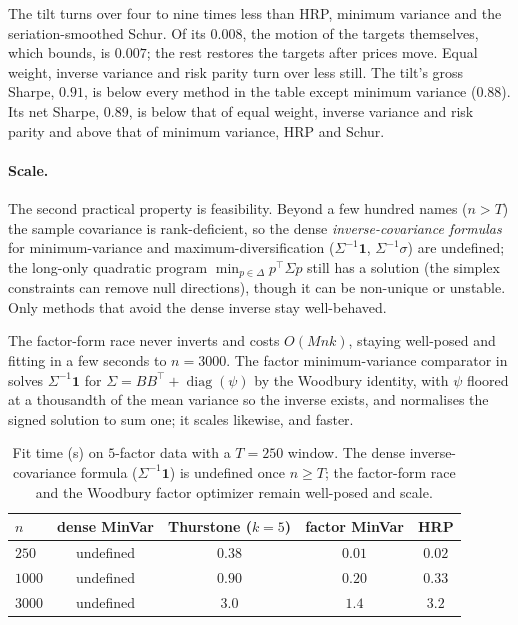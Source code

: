 The tilt turns over four to nine times less than HRP, minimum variance and the
seriation-smoothed Schur. Of its $0.008$, the motion of the targets themselves,
which  bounds, is $0.007$; the rest restores the targets after
prices move. Equal weight, inverse variance and risk parity turn over less still.
The tilt's gross Sharpe, $0.91$, is below every method in the table except
minimum variance ($0.88$). Its net Sharpe, $0.89$, is below that of equal weight,
inverse variance and risk parity and above that of minimum variance, HRP and
Schur.

\paragraph{Scale.}
The second practical property is feasibility.
Beyond a few hundred names ($n > T$)
the sample covariance is rank-deficient, so the dense \emph{inverse-covariance
formulas} for minimum-variance and maximum-diversification
\parencite{choueifaty2008} ($\Sigma^{-1}\mathbf 1$, $\Sigma^{-1}\sigma$) are
undefined; the long-only quadratic program
$\min_{p\in\Delta} p^\top\Sigma p$ still has a solution (the simplex constraints can
remove null directions), though it can be non-unique or unstable.
Only
methods that avoid the dense inverse stay well-behaved.

The factor-form
race never inverts and costs $O(Mnk)$, staying well-posed
and fitting in a few seconds to $n = 3000$.
The factor minimum-variance comparator
in  solves $\Sigma^{-1}\mathbf 1$ for
$\Sigma = BB^\top + \operatorname{diag}(\psi)$ by the Woodbury identity, with
$\psi$ floored at a thousandth of the mean variance so the inverse exists, and
normalises the signed solution to sum one; it scales likewise, and faster.

\begin{table}[h]
  \centering
  \caption{Fit time (s) on $5$-factor data with a $T=250$ window. The dense
  inverse-covariance formula ($\Sigma^{-1}\mathbf 1$) is undefined once $n \ge T$;
  the factor-form race and the Woodbury factor optimizer remain well-posed and
  scale.}
  \label{tab:scale}
  \begin{tabular}{lcccc}
    \toprule
    $n$  & dense MinVar & Thurstone ($k{=}5$) & factor MinVar & HRP \\
    \midrule
    $250$  & undefined & $0.38$ & $0.01$ & $0.02$ \\
    $1000$ & undefined & $0.90$ & $0.20$ & $0.33$ \\
    $3000$ & undefined & $3.0$  & $1.4$  & $3.2$  \\
    \bottomrule
  \end{tabular}
\end{table}


